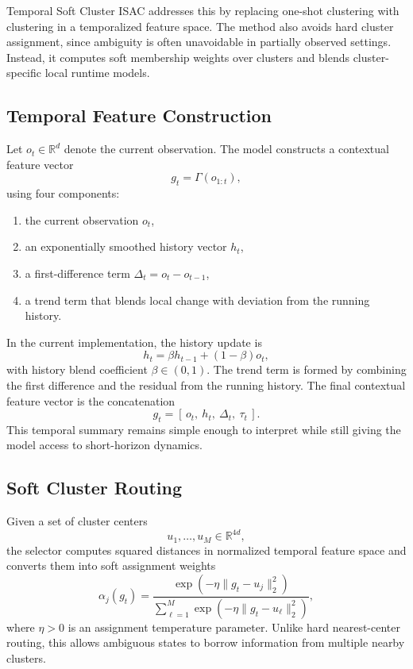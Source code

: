 \documentclass[conference]{IEEEtran}
\begin{document}
Temporal Soft Cluster ISAC addresses this by replacing one-shot clustering with clustering in a temporalized feature space. The method also avoids hard cluster assignment, since ambiguity is often unavoidable in partially observed settings. Instead, it computes soft membership weights over clusters and blends cluster-specific local runtime models.

\subsection{Temporal Feature Construction}

Let $o_t \in \mathbb{R}^d$ denote the current observation. The model constructs a contextual feature vector
\[
g_t = \Gamma(o_{1:t}),
\]
using four components:
\begin{enumerate}
\item the current observation $o_t$,
\item an exponentially smoothed history vector $h_t$,
\item a first-difference term $\Delta_t = o_t - o_{t-1}$,
\item a trend term that blends local change with deviation from the running history.
\end{enumerate}

In the current implementation, the history update is
\[
h_t = \beta h_{t-1} + (1-\beta)o_t,
\]
with history blend coefficient $\beta \in (0,1)$. The trend term is formed by combining the first difference and the residual from the running history. The final contextual feature vector is the concatenation
\[
g_t = [\,o_t,\ h_t,\ \Delta_t,\ \tau_t\,].
\]
This temporal summary remains simple enough to interpret while still giving the model access to short-horizon dynamics.

\subsection{Soft Cluster Routing}

Given a set of cluster centers
\[
u_1,\dots,u_M \in \mathbb{R}^{4d},
\]
the selector computes squared distances in normalized temporal feature space and converts them into soft assignment weights
\[
\alpha_j(g_t) =
\frac{\exp\!\left(-\eta \lVert g_t - u_j \rVert_2^2\right)}
{\sum_{\ell=1}^M \exp\!\left(-\eta \lVert g_t - u_\ell \rVert_2^2\right)},
\]
where $\eta > 0$ is an assignment temperature parameter. Unlike hard nearest-center routing, this allows ambiguous states to borrow information from multiple nearby clusters.
\end{document}
